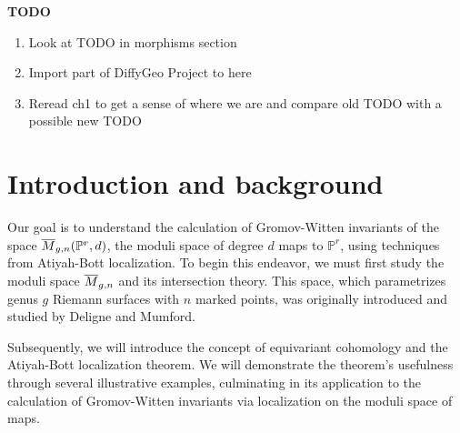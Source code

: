 \documentclass[12pt]{memoir}
\author{\nauthor}
\begin{document}

\tableofcontents
\newpage
\textbf{TODO}
\begin{enumerate}
    \item Look at TODO in morphisms section
    \item Import part of DiffyGeo Project to here
    \item Reread ch1 to get a sense of where we are and compare old TODO with a possible new TODO
\end{enumerate}
\newpage
\chapter{Introduction and background}

Our goal is to understand the calculation of Gromov-Witten invariants of the space $\overline{M}_{g,n}(\mathbb{P}^r,d)$, the moduli space of degree $d$ maps to $\mathbb{P}^r$, using techniques from Atiyah-Bott localization. To begin this endeavor, we must first study the moduli space $\overline{M}_{g,n}$ and its intersection theory. This space, which parametrizes genus $g$ Riemann surfaces with $n$ marked points, was originally introduced and studied by Deligne and Mumford.

Subsequently, we will introduce the concept of equivariant cohomology and the Atiyah-Bott localization theorem. We will demonstrate the theorem's usefulness through several illustrative examples, culminating in its application to the calculation of Gromov-Witten invariants via localization on the moduli space of maps.
\end{document}
